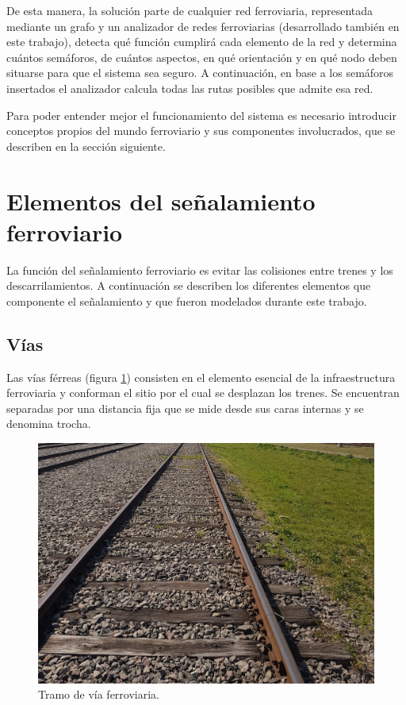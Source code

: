 		De esta manera, la solución parte de cualquier red ferroviaria, representada mediante un grafo y un analizador de redes ferroviarias (desarrollado también en este trabajo), detecta qué función cumplirá cada elemento de la red y determina cuántos semáforos, de cuántos aspectos, en qué orientación y en qué nodo deben situarse para que el sistema sea seguro. A continuación, en base a los semáforos insertados el analizador calcula todas las rutas posibles que admite esa red.
	
		Para poder entender mejor el funcionamiento del sistema es necesario introducir conceptos propios del mundo ferroviario y sus componentes involucrados, que se describen en la sección siguiente.

	\section{Elementos del señalamiento ferroviario}
	
		La función del señalamiento ferroviario es evitar las colisiones entre trenes y los descarrilamientos. A continuación se describen los diferentes elementos que componente el señalamiento y que fueron modelados durante este trabajo.
		
		\subsection{Vías}
			
			Las vías férreas (figura \ref{fig:Via_eclisa}) consisten en el elemento esencial de la infraestructura ferroviaria y conforman el sitio por el cual se desplazan los trenes. Se encuentran separadas por una distancia fija que se mide desde sus caras internas y se denomina trocha.
			
			\begin{figure}[htbp!]
				\centering
				\includegraphics[scale=.07]{./Figures/Tramo_via}
				\caption{Tramo de vía ferroviaria.}
				\label{fig:Via_eclisa}
			\end{figure}	
			
